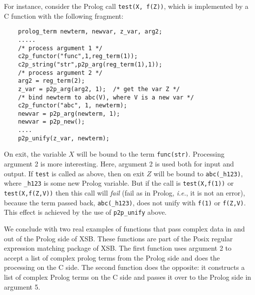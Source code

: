 For instance, consider the Prolog call {\tt test(X, f(Z))},
which is implemented by a C function with the following fragment:
\begin{verbatim}
    prolog_term newterm, newvar, z_var, arg2;
    .....
    /* process argument 1 */
    c2p_functor("func",1,reg_term(1));
    c2p_string("str",p2p_arg(reg_term(1),1));
    /* process argument 2 */
    arg2 = reg_term(2);
    z_var = p2p_arg(arg2, 1);  /* get the var Z */
    /* bind newterm to abc(V), where V is a new var */
    c2p_functor("abc", 1, newterm);
    newvar = p2p_arg(newterm, 1);
    newvar = p2p_new();
    ....
    p2p_unify(z_var, newterm);
\end{verbatim}
On exit, the variable $X$ will be bound to the term {\tt func(str)}.
Processing argument 2 is more interesting. Here, argument 2 is used both
for input and output. If {\tt test} is called as above, then on exit $Z$
will be bound to {\tt abc(\_h123)}, where {\tt \_h123} is some new Prolog
variable. But if the call is {\tt test(X,f(1))} or {\tt test(X,f(Z,V))}
then this call will \emph{fail} (fail as in Prolog, {\it i.e.}, it is not
an error), because the term passed back, {\tt abc(\_h123)}, does not unify
with {\tt f(1)} or {\tt f(Z,V)}. This effect is achieved by the use of
{\tt p2p\_unify} above.

We conclude with two real examples of functions that pass complex data in
and out of the Prolog side of XSB. These functions are part of the Posix
regular expression matching package of XSB. The first function uses
argument 2 to accept a
list of complex prolog terms from the Prolog side and does the processing
on the C side. The second function does the opposite: it constructs
a list of complex Prolog terms on the C side and passes it over to the
Prolog side in argument 5.

